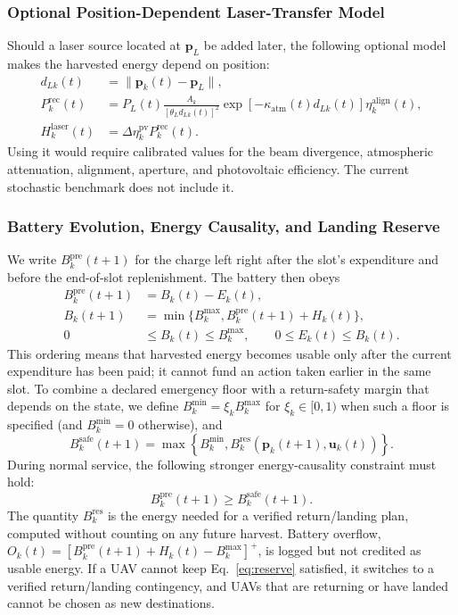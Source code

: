 \subsubsection{Optional Position-Dependent Laser-Transfer Model}
Should a laser source located at $\boldsymbol p_L$ be added later, the
following optional model makes the harvested energy depend on position:
\begin{equation}
\begin{aligned}
d_{Lk}(t)&=\|\boldsymbol p_k(t)-\boldsymbol p_L\|,\\
P_k^{\mathrm{rec}}(t)&=
P_L(t)\frac{A_k}{[\theta_Ld_{Lk}(t)]^2}
\exp[-\kappa_{\mathrm{atm}}(t)d_{Lk}(t)]
\eta_k^{\mathrm{align}}(t),\\
H_k^{\mathrm{laser}}(t)&=\Delta\eta_k^{\mathrm{pv}}
P_k^{\mathrm{rec}}(t).
\end{aligned}
\label{eq:optional_laser}
\end{equation}
Using it would require calibrated values for the beam divergence, atmospheric
attenuation, alignment, aperture, and photovoltaic efficiency. The current
stochastic benchmark does not include it.

\subsubsection{Battery Evolution, Energy Causality, and Landing Reserve}
We write $B_k^{\mathrm{pre}}(t+1)$ for the charge left right after the
slot's expenditure and before the end-of-slot replenishment. The battery then
obeys
\begin{equation}
\begin{aligned}
B_k^{\mathrm{pre}}(t+1)&=B_k(t)-E_k(t),\\
B_k(t+1)&=\min\{B_k^{\max},
B_k^{\mathrm{pre}}(t+1)+H_k(t)\},\\
0&\le B_k(t)\le B_k^{\max},\qquad
0\le E_k(t)\le B_k(t).
\end{aligned}
\label{eq:battery}
\end{equation}
This ordering means that harvested energy becomes usable only after the
current expenditure has been paid; it cannot fund an action taken earlier in
the same slot. To
combine a declared emergency floor with a return-safety margin that depends
on the state, we define
$B_k^{\min}=\xi_kB_k^{\max}$ for $\xi_k\in[0,1)$ when such a floor is
specified (and $B_k^{\min}=0$ otherwise), and
\[
B_k^{\mathrm{safe}}(t+1)=\max\!\left\{B_k^{\min},
B_k^{\mathrm{res}}(\boldsymbol p_k(t+1),\boldsymbol u_k(t))\right\}.
\]
During normal service, the following stronger energy-causality constraint
must hold:
\begin{equation}
B_k^{\mathrm{pre}}(t+1)\ge B_k^{\mathrm{safe}}(t+1).
\label{eq:reserve}
\end{equation}
The quantity $B_k^{\mathrm{res}}$ is the energy needed for a verified
return/landing plan, computed without counting on any future harvest. Battery
overflow, $O_k(t)=[B_k^{\mathrm{pre}}(t+1)+H_k(t)-B_k^{\max}]^+$, is logged
but not credited as usable energy. If a UAV cannot keep
Eq.~\eqref{eq:reserve} satisfied, it switches to a verified return/landing
contingency, and UAVs that are returning or have landed cannot be chosen as
new destinations.

